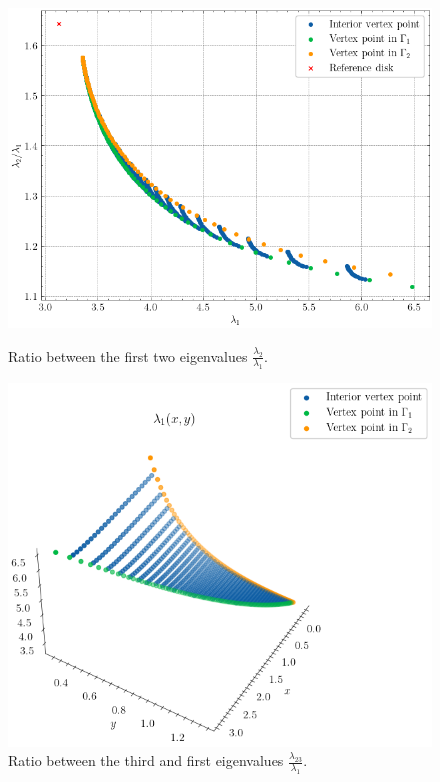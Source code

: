 \begin{figure}[!htb]
    \begin{minipage}[c]{0.41\textwidth}
        \centering
        \includegraphics[width=\textwidth]{Images/Dirac/triangles/triangle_benguria.png}
        \captionsetup{width=0.8\linewidth} %
        \caption{Ratio between the first two eigenvalues \(\frac{\lambda_2}{\lambda_1}\).}
        \label{dirac_triangle_benguria}
    \end{minipage}
    \hfill
    \begin{minipage}[c]{0.50\textwidth}
        \centering
        \includegraphics[width=\textwidth]{Images/Dirac/triangles/triangle_3d_lambda1.png}
        \captionsetup{width=0.8\linewidth} %
        \caption{Ratio between the third and first eigenvalues \(\frac{\lambda_23}{\lambda_1}\).}
        \label{dirac_triangle_3d_lambda1}
    \end{minipage}
    \vspace{0.5cm}
\end{figure}

